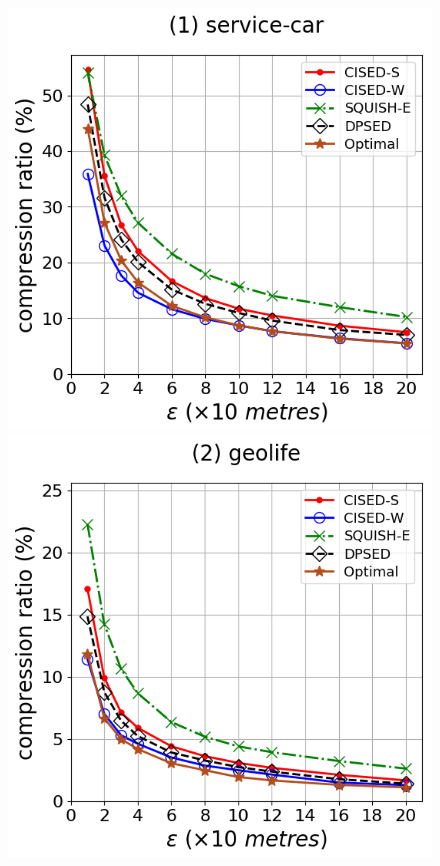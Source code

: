 {\begin{figure}[tb!]
\centering
\includegraphics[scale = 0.275]{Figures/Exp-opt-CR-epsilon-service.png}\hspace{3ex}
\includegraphics[scale = 0.275]{Figures/Exp-opt-CR-epsilon-geolife.png}\hspace{3ex}

\end{figure}}
